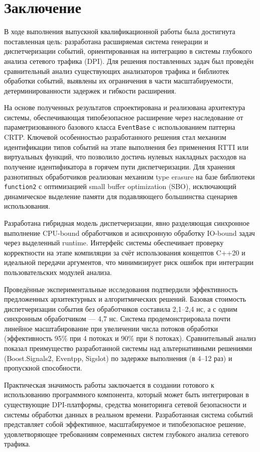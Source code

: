 \section{Заключение}

В ходе выполнения выпускной квалификационной работы была достигнута поставленная цель: разработана расширяемая система генерации и диспетчеризации событий, ориентированная на интеграцию в системы глубокого анализа сетевого трафика (DPI). Для решения поставленных задач был проведён сравнительный анализ существующих анализаторов трафика и библиотек обработки событий, выявлены их ограничения в части масштабируемости, детерминированности задержек и гибкости расширения.

На основе полученных результатов спроектирована и реализована архитектура системы, обеспечивающая типобезопасное расширение через наследование от параметризованного базового класса \texttt{EventBase} с использованием паттерна CRTP. Ключевой особенностью разработанного решения стал механизм идентификации типов событий на этапе выполнения без применения RTTI или виртуальных функций, что позволило достичь нулевых накладных расходов на получение идентификатора в горячем пути диспетчеризации. Для хранения разнотипных обработчиков реализован механизм type erasure на базе библиотеки \texttt{function2} с оптимизацией small buffer optimization (SBO), исключающий динамическое выделение памяти для подавляющего большинства сценариев использования.

Разработана гибридная модель диспетчеризации, явно разделяющая синхронное выполнение CPU-bound обработчиков и асинхронную обработку IO-bound задач через выделенный runtime. Интерфейс системы обеспечивает проверку корректности на этапе компиляции за счёт использования концептов C++20 и идеальной передачи аргументов, что минимизирует риск ошибок при интеграции пользовательских модулей анализа.

Проведённые экспериментальные исследования подтвердили эффективность предложенных архитектурных и алгоритмических решений.
Базовая стоимость диспетчеризации события без обработчиков составила 2,1--2,4 нс, а с одним синхронным обработчиком --- 4,7 нс.
Система продемонстрировала почти линейное масштабирование при увеличении числа потоков обработки (эффективность 95\% при 4 потоках и 90\% при 8 потоках).
Сравнительный анализ показал преимущество разработанной системы над альтернативными решениями (Boost.Signals2, Eventpp, Sigslot) по задержке выполнения (в 4--12 раз) и пропускной способности.

Практическая значимость работы заключается в создании готового к использованию программного компонента, который может быть интегрирован в существующие DPI-платформы, средства мониторинга сетевой безопасности и системы обработки данных в реальном времени.
Разработанная система событий представляет собой эффективное, масштабируемое и типобезопасное решение, удовлетворяющее требованиям современных систем глубокого анализа сетевого трафика.
\newpage